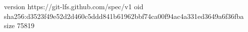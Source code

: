 version https://git-lfs.github.com/spec/v1
oid sha256:d3523f49e52d2d460c5ddd841b61962bbf74ca00f94ac4a331ed3649a6f36fba
size 75819

